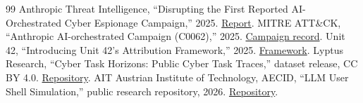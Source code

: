 \documentclass[10pt]{article}
\begin{document}
\begin{thebibliography}{99}
 Anthropic Threat Intelligence, ``Disrupting the First Reported AI-Orchestrated Cyber Espionage Campaign,'' 2025. \href{https://www.anthropic.com/news/disrupting-AI-espionage}{Report}.
 MITRE ATT\&CK, ``Anthropic AI-orchestrated Campaign (C0062),'' 2025. \href{https://attack.mitre.org/campaigns/C0062/}{Campaign record}.
 Unit 42, ``Introducing Unit 42's Attribution Framework,'' 2025. \href{https://unit42.paloaltonetworks.com/unit-42-attribution-framework/}{Framework}.
 Lyptus Research, ``Cyber Task Horizons: Public Cyber Task Traces,'' dataset release, CC BY 4.0. \href{https://github.com/lyptus-research/cyber-task-horizons-data}{Repository}.
 AIT Austrian Institute of Technology, AECID, ``LLM User Shell Simulation,'' public research repository, 2026. \href{https://github.com/ait-aecid/llm-user-shell-sim}{Repository}.
\end{thebibliography}
\end{document}
